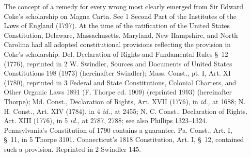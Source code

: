
  The concept of a remedy for every wrong most clearly emerged from Sir Edward Coke's scholarship on Magna Carta. See 1 Second Part of the Institutes of the Laws of England (1797). At the time of the ratification of the United States Constitution, Delaware, Massachusetts, Maryland, New Hampshire, and North Carolina had all adopted constitutional provisions reflecting the provision in Coke's scholarship. Del. Declaration of Rights and Fundamental Rules \S~12 (1776), reprinted in 2 W. Swindler, Sources and Documents of United States Constitutions 198 (1973) (hereinafter Swindler); Mass. Const., pt. I, Art. XI (1780), reprinted in 3 Federal and State Constitutions, Colonial Charters, and Other Organic Laws 1891 (F. Thorpe ed. 1909) (reprinted 1993) (hereinafter Thorpe); Md. Const., Declaration of Rights, Art. XVII (1776), in \emph{id.,} at 1688; N. H. Const., Art. XIV (1784), in 4 \emph{id.,} at 2455; N. C. Const., Declaration of Rights, Art. XIII (1776), in 5 \emph{id.,} at 2787, 2788; see also Phillips 1323--1324. Pennsylvania's Constitution of 1790 contains a guarantee. Pa. Const., Art. I, \S~11, in 5 \newpage  Thorpe 3101. Connecticut's 1818 Constitution, Art. I, \S~12, contained such a provision. Reprinted in 2 Swindler 145.

